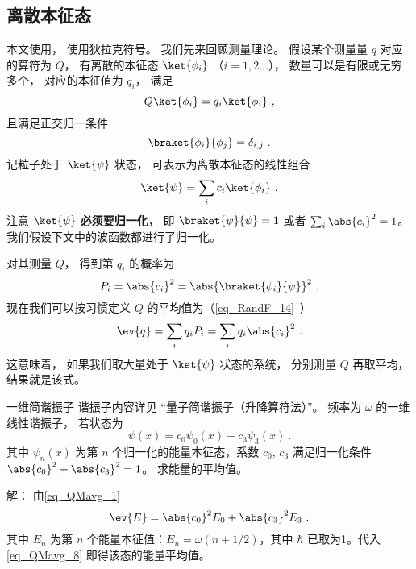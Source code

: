 
\begin{issues}
\issueTODO 
\end{issues}


\subsection{离散本征态}

本文使用， 使用狄拉克符号。 我们先来回顾测量理论。 假设某个测量量 $q$ 对应的算符为 $Q$， 有离散的本征态 $\ket{\phi_i}$ （$i = 1,2\dots$）， 数量可以是有限或无穷多个， 对应的本征值为 $q_i$， 满足
\begin{equation}\label{eq_QMavg_3}
Q\ket{\phi_i} = q_i \ket{\phi_i}~,
\end{equation}
且满足正交归一条件
\begin{equation}\label{eq_QMavg_4}
\braket{\phi_i}{\phi_j} = \delta_{i,j}~.
\end{equation}
记粒子处于 $\ket{\psi}$ 状态， 可表示为离散本征态的线性组合
\begin{equation}\label{eq_QMavg_2}
\ket{\psi} = \sum_i c_i \ket{\phi_i}~.
\end{equation}
注意 $\ket{\psi}$ \textbf{必须要归一化}， 即 $\braket{\psi}{\psi} = 1$ 或者 $\sum_i \abs{c_i}^2 = 1$。 我们假设下文中的波函数都进行了归一化。

对其测量 $Q$， 得到第 $q_i$ 的概率为
\begin{equation}
P_i = \abs{c_i}^2 = \abs{\braket{\phi_i}{\psi}}^2~.
\end{equation}
现在我们可以按习惯定义 $Q$ 的平均值为（\autoref{eq_RandF_14}~）
\begin{equation}\label{eq_QMavg_1}
\ev{q} = \sum_i q_i P_i = \sum_i q_i \abs{c_i}^2~.
\end{equation}
这意味着， 如果我们取大量处于 $\ket{\psi}$ 状态的系统， 分别测量 $Q$ 再取平均， 结果就是该式。

\begin{example}{一维简谐振子}
谐振子内容详见 “量子简谐振子（升降算符法）”。 频率为 $\omega$ 的一维线性谐振子， 若状态为
\begin{equation}
\psi(x)=c_0 \psi_0(x)+c_3\psi_3(x)~.
\end{equation}
其中 $\psi_n(x)$ 为第 $n$ 个归一化的能量本征态，系数 $c_0$, $c_3$ 满足归一化条件 $\abs{c_0}^2+\abs{c_3}^2 = 1$。 求能量的平均值。

解： 由\autoref{eq_QMavg_1}
\begin{equation}\label{eq_QMavg_8}
\ev{E}=\abs{c_0}^2 E_0+\abs{c_3}^2 E_3~.
\end{equation}
其中 $E_n$ 为第 $n$ 个能量本征值：$E_n=\omega(n+1/2)$，其中 $\hbar$ 已取为1。代入\autoref{eq_QMavg_8} 即得该态的能量平均值。
\end{example}


